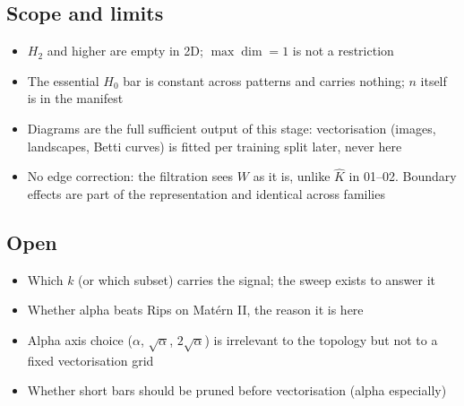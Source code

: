 \documentclass[11pt]{article}
\begin{document}
\subsection*{Scope and limits}
\begin{itemize}
  \item $H_2$ and higher are empty in 2D; $\max\dim=1$ is not a restriction
  \item The essential $H_0$ bar is constant across patterns and carries nothing; $n$ itself is in the manifest
  \item Diagrams are the full sufficient output of this stage: vectorisation (images, landscapes, Betti curves) is fitted per training split later, never here
  \item No edge correction: the filtration sees $W$ as it is, unlike $\hat K$ in 01--02. Boundary effects are part of the representation and identical across families
\end{itemize}

\subsection*{Open}
\begin{itemize}
  \item Which $k$ (or which subset) carries the signal; the sweep exists to answer it
  \item Whether alpha beats Rips on Mat\'ern II, the reason it is here
  \item Alpha axis choice ($\alpha$, $\sqrt\alpha$, $2\sqrt\alpha$) is irrelevant to the topology but not to a fixed vectorisation grid
  \item Whether short bars should be pruned before vectorisation (alpha especially)
\end{itemize}
\end{document}
